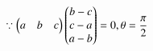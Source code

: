     \begin{align}
\because \begin{pmatrix}a&b&c\end{pmatrix}\begin{pmatrix}b-c\\c-a\\a-b\end{pmatrix} = 0,
   \theta=\frac{\pi}{2}
    \end{align}
